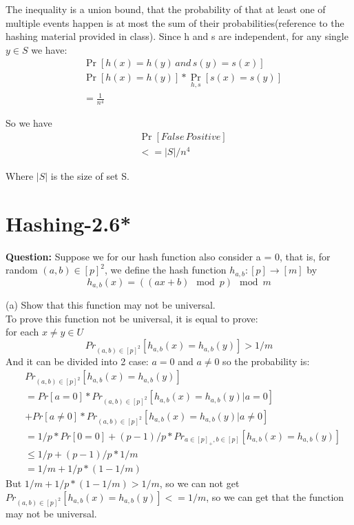 \documentclass[12pt]{article}
\begin{document}
The inequality is a union bound, that the probability of that at least one of multiple events happen is at most the sum of their probabilities(reference to the hashing material provided in class). Since h and s are independent, for any single $y \in S$ we have:
\begin{equation}
\begin{aligned}
&\mathop{Pr} [h(x)=h(y) \, and \, s(y)=s(x)] \\
&\mathop{Pr} [h(x)=h(y)] * \mathop{Pr} \limits_{h,s} [s(x)=s(y)] \\
&= \frac{1}{n^4}
\end{aligned}
\end{equation}

So we have
\begin{equation}
\begin{aligned}
&\mathop{Pr}  [False \, Positive]\\
&<= |S|/n^4
\end{aligned}
\end{equation}

Where $|S|$ is the size of set S.

\section{Hashing-2.6*}
\textbf{Question:}
Suppose we for our hash function also consider a = 0, that is, for random \((a, b)\in[p]^2\), we define the hash function \(h_{a,b} : [p] \rightarrow [m]\) by
\[h_{a,b}(x) = ((ax + b)\mod{p} )\mod{m}\]

(a) Show that this function may not be universal.\\

To prove this function not be universal, it is equal to prove:\\
for each $x\neq y \in U$\\
\[Pr_{(a,b)\in[p]^2}[h_{a,b}(x) = h_{a,b}(y)] > 1/m\]
And it can be divided into 2 case: $a = 0$ and $a \neq 0$ so the probability is:\\
\begin{equation}
    \begin{aligned}
        &Pr_{(a,b)\in[p]^2}[h_{a,b}(x) = h_{a,b}(y)]\\
        &= Pr[a = 0]* Pr_{(a,b)\in[p]^2}[h_{a,b}(x) = h_{a,b}(y) | a = 0] \\
        &+  Pr[a \neq 0] * Pr_{(a,b)\in[p]^2}[h_{a,b}(x) = h_{a,b}(y) | a \neq 0]\\
        &=1/p * Pr[0 = 0] + (p - 1)/p* Pr_{a \in [p]_+, b \in [p]}[h_{a,b}(x) = h_{a,b}(y)]\\
        &\leq 1 / p + (p - 1)/ p * 1 / m\\
        &= 1 / m + 1 / p * ( 1 - 1 / m)
    \end{aligned}
\end{equation}
But $1/m + 1/p * (1 - 1/m) > 1 / m$, so we can not get $Pr_{(a,b)\in[p]^2}[h_{a,b}(x) = h_{a,b}(y)] <= 1 / m$, so we can get that the function may not be universal.
\end{document}

